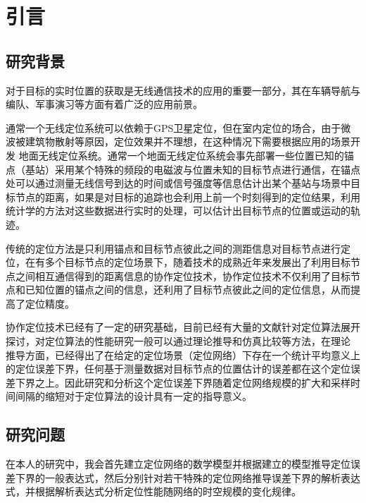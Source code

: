 \chapter{引言}
\label{cha:intro}

\section{研究背景}
对于目标的实时位置的获取是无线通信技术的应用的重要一部分，其在车辆导航与编队、军事演习等方面有着广泛的应用前景。


通常一个无线定位系统可以依赖于GPS卫星定位，但在室内定位的场合，由于微波被建筑物散射等原因，定位效果并不理想，在这种情况下需要根据应用的场景开发
地面无线定位系统。通常一个地面无线定位系统会事先部署一些位置已知的锚点（基站）采用某个特殊的频段的电磁波与位置未知的目标节点进行通信，在锚点处可以通过测量无线信号到达的时间或信号强度等信息估计出某个基站与场景中目标节点的距离，如果是对目标的追踪也会利用上前一个时刻得到的定位结果，利用统计学的方法对这些数据进行实时的处理，可以估计出目标节点的位置或运动的轨迹。


传统的定位方法是只利用锚点和目标节点彼此之间的测距信息对目标节点进行定位，在有多个目标节点的定位场景下，随着技术的成熟近年来发展出了利用目标节点之间相互通信得到的距离信息的协作定位技术，协作定位技术不仅利用了目标节点和已知位置的锚点之间的信息，还利用了目标节点彼此之间的定位信息，从而提高了定位精度。


协作定位技术已经有了一定的研究基础，目前已经有大量的文献针对定位算法展开探讨，对定位算法的性能研究一般可以通过理论推导和仿真比较等方法，在理论
推导方面，已经得出了在给定的定位场景（定位网络）下存在一个统计平均意义上的定位误差下界\cite{LimitBound}，任何基于测量数据对目标节点的位置估计的误差都在这个定位误差下界之上。因此研究和分析这个定位误差下界随着定位网络规模的扩大和采样时间间隔的缩短对于定位算法的设计具有一定的指导意义。

\section{研究问题}
在本人的研究中，我会首先建立定位网络的数学模型并根据建立的模型推导定位误差下界的一般表达式，然后分别针对若干特殊的定位网络推导误差下界的解析表达式，并根据解析表达式分析定位性能随网络的时空规模的变化规律。

